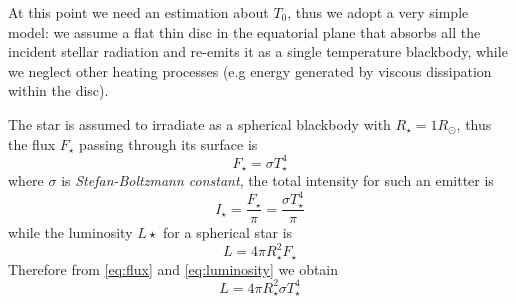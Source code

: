 \documentclass[aps,prb,twocolumn,superscriptaddress,floatfix,longbibliography]{revtex4-2}
\begin{document}
At this point we need an estimation about $T_0$, thus we adopt a very simple model: we assume a flat thin disc in the equatorial plane that absorbs all the incident stellar radiation and re-emits it as a single temperature blackbody, while we neglect other heating processes (e.g energy generated by viscous dissipation within the disc).

The star is assumed to irradiate as a spherical blackbody with $R_{\star} =1 R_{\odot} $, thus the flux $F_{\star}$ passing through its surface is
\begin{equation}\label{eq:flux}
  F_{\star}=\sigma T_{\star}^4
\end{equation}
where $\sigma$ is {\it Stefan-Boltzmann constant}, the total intensity for such an emitter is
\begin{equation}\label{eq:total intensity}
    I_{\star} = \frac{F_{\star}}{\pi} = \frac{\sigma T_{\star}^4}{\pi}
\end{equation}
while the luminosity $L{\star}$ for a spherical star is
\begin{equation}\label{eq:luminosity}
  L = 4\pi R_{\star}^2 F_{\star}
\end{equation}
Therefore from \eqref{eq:flux} and \eqref{eq:luminosity} we obtain
\begin{equation}\label{eq:luminosity2}
  L = 4 \pi R_{\star}^2 \sigma T_{\star}^4
\end{equation}
\end{document}
